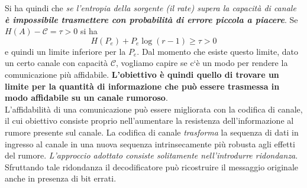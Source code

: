 Si ha quindi che \textit{se l’entropia della sorgente (il rate) supera la capacit\`a di canale \textbf{\`e impossibile trasmettere con probabilità di errore piccola a piacere}}. Se $H(A) - \mathcal{C} = \tau > 0$ si ha
\begin{equation*}
    H(P_e) + P_e \log (r-1) \geq \tau > 0
\end{equation*}
e quindi un limite inferiore per la $P_e$. Dal momento che esiste questo limite, dato un certo canale con capacità $\mathcal{C}$, vogliamo capire se c`è un modo per rendere la comunicazione più affidabile. \textbf{L’obiettivo è quindi quello di trovare un limite per la quantità di informazione che può essere trasmessa in modo affidabile su un canale rumoroso}. \\
L’affidabilità di una comunicazione può essere migliorata con la codifica di canale, il cui obiettivo consiste proprio nell’aumentare la resistenza dell’informazione al rumore presente sul canale. La codifica di canale \textit{trasforma} la sequenza di dati in ingresso al canale in una nuova sequenza intrinsecamente più robusta agli effetti del rumore. \textit{L’approccio adottato consiste solitamente nell’introdurre ridondanza}. Sfruttando tale ridondanza il decodificatore può ricostruire il messaggio originale anche in presenza di bit errati.
